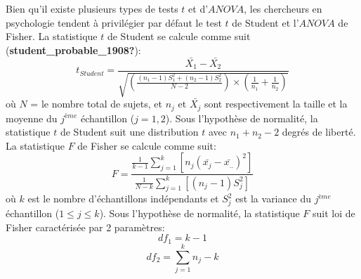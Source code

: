 \documentclass[
  english,
  man]{apa6}
\begin{document}
Bien qu'il existe plusieurs types de tests \(t\) et d'\(ANOVA\), les chercheurs en psychologie tendent à privilégier par défaut le test \(t\) de Student et l'\(ANOVA\) de Fisher. La statistique \(t\) de Student se calcule comme suit (\textbf{student\_probable\_1908?}):
\begin{equation} 
t_{Student}=\frac{\bar{X_1}-\bar{X_2}}{\sqrt{\left(\frac{(n_1-1)S_1^2+(n_2-1)S_2^2}{N-2}\right) \times \left(\frac{1}{n_1}+\frac{1}{n_2}\right)}}
\label{Student}
\end{equation}
où \(N\) = le nombre total de sujets, et \(n_j\) et \(\bar{X_j}\) sont respectivement la taille et la moyenne du \(j^{ème}\) échantillon (\(j = 1, 2\)). Sous l'hypothèse de normalité, la statistique \(t\) de Student suit une distribution \(t\) avec \(n_1+n_2-2\) degrés de liberté. La statistique \(F\) de Fisher se calcule comme suit:\\
\begin{equation} 
F=\frac{\frac{1}{k-1}\sum_{j=1}^k \left[n_j\left(\bar{x_{j}}-\bar{x_{..}}\right)^2 \right]}{\frac{1}{N-k}\sum_{j=1}^k \left[\left(n_j-1\right)S_j^2 \right]}
\label{Fisher}
\end{equation}
où \(k\) est le nombre d'échantillons indépendants et \(S^2_j\) est la variance du \(j^{ème}\) échantillon (\(1 \le j \le k\)). Sous l'hypothèse de normalité, la statistique \(F\) suit loi de Fisher caractérisée par 2 paramètres:
\begin{equation*} 
df_1 = k-1
\end{equation*}
\begin{equation*} 
df_2 = \sum_{j=1}^k{n_j}-k
\end{equation*}
\end{document}
